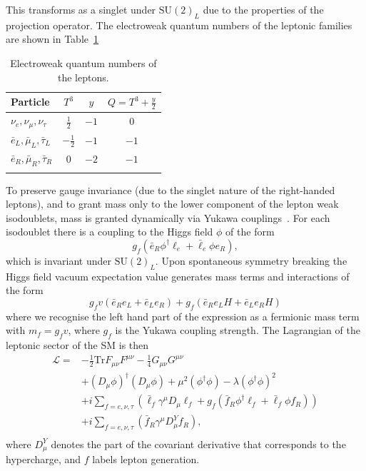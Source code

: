 This transforms as a singlet under $\mathrm{SU}(2)_{L}$ due to the properties of the projection operator. The electroweak quantum numbers of the leptonic families are shown in Table~\ref{tab:theory:elecroweak_qn_leptons}
\begin{table}[h!]
    \centering
\renewcommand{\arraystretch}{1.3}
\begin{tabular}{ l | c c c }
    \thickhline
    Particle & $T^{3}$ & $y$ & $Q = T^3 + \frac{y}{2}$ \\
    \hline
    $\nu_{e},\nu_{\mu},\nu_{\tau}$  & $\frac{1}{2} $ & $-1$ & $0$ \\
    $\bar{e}_{L},\bar{\mu}_{L},\bar{\tau}_{L}$  & $-\frac{1}{2} $ & $-1$ & $-1$ \\
    $\bar{e}_{R},\bar{\mu}_{R},\bar{\tau}_{R}$  & $0$  & $-2$ & $-1$ \\
    \thickhline
\end{tabular}%
\caption{Electroweak quantum numbers of the leptons.}
 \label{tab:theory:elecroweak_qn_leptons}
\end{table}

To preserve gauge invariance (due to the singlet nature of the right-handed leptons), and to grant mass only to the lower component of the lepton weak isodoublets, mass is granted dynamically via Yukawa couplings~\cite{Maggiore}. For each isodoublet there is a coupling to the Higgs field $\phi$ of the form
\begin{equation}
    \label{eq:theory:lepton_yukawa}
    g_{f}(\bar{e}_{R}\phi^{\dag}\ell_{e} + \bar{\ell}_{e}\phi{e}_{R}),
\end{equation}
which is invariant under $\mathrm{SU}(2)_{L}$. Upon spontaneous symmetry breaking the Higgs field vacuum expectation value generates mass terms and interactions of the form
\begin{equation}
    \label{eq:theory:lepton_mass_higgs_int}
    g_{f}v(\bar{e}_{R}e_{L} + \bar{e}_{L}e_{R}) + g_{f}(\bar{e}_{R}e_{L}H + \bar{e}_{L}e_{R}H)
\end{equation}
where we recognise the left hand part of the expression as a fermionic mass term with $m_{f} = g_{f}v$, where $g_f$ is the Yukawa coupling strength. The Lagrangian of the leptonic sector of the SM is then
\begin{equation}
    \begin{split}
    \mathcal{L} =& -\frac{1}{2}\mathrm{Tr}F_{\mu\nu}F^{\mu\nu} - \frac{1}{4}G_{\mu\nu}G^{\mu\nu} \\
                 &+ (D_{\mu}\phi)^{\dag}(D_{\mu}\phi) + \mu^{2}(\phi^{\dag}\phi) - \lambda(\phi^{\dag}\phi)^{2} \\
                 &+ i\sum_{f=e,\nu,\tau}(\bar{\ell}_{f}\gamma^{\mu}D_{\mu}\ell_{f} + g_{f}(\bar{f}_{R}\phi^{\dag}\ell_{f} + \bar{\ell}_{f}\phi{f}_{R})) \\
                 &+ i\sum_{f=e,\nu,\tau}(\bar{f}_{R}\gamma^{\mu}D^{Y}_{\mu}f_{R}), \\
    \end{split}
\end{equation}
where $D^{Y}_{\mu}$ denotes the part of the covariant derivative that corresponds to the hypercharge, and $f$ labels lepton generation. 

